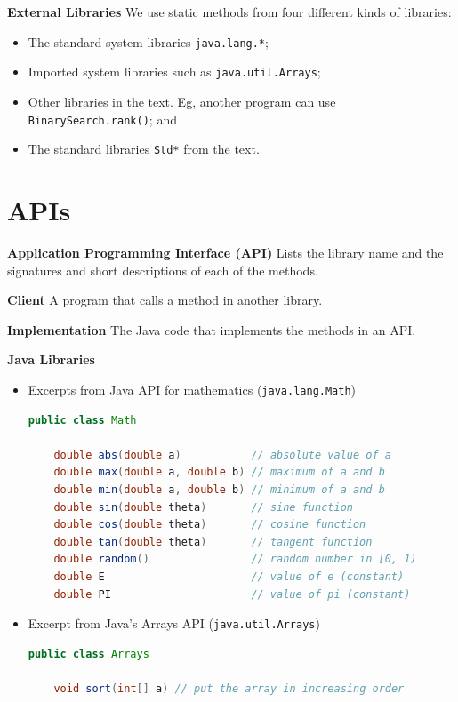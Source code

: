 \documentclass[8pt,a4paper,compress]{beamer}
\begin{document}
\begin{frame}[fragile]
\pause
\textbf{External Libraries} We use static methods from four different kinds of libraries:
\begin{itemize}
\item The standard system libraries \lstinline$java.lang.*$; 
\item Imported system libraries such as \lstinline$java.util.Arrays$; 
\item Other libraries in the text. Eg, another program can use \lstinline$BinarySearch.rank()$; and
\item The standard libraries \lstinline$Std*$ from the text.
\end{itemize}
\end{frame}

\section{APIs}
\begin{frame}[fragile]
\pause
\textbf{Application Programming Interface (API)} Lists the library name and the signatures and short descriptions of each of the methods. 

\pause
\smallskip

\textbf{Client} A program that calls a method in another library.

\pause
\smallskip

\textbf{Implementation} The Java code that implements the methods in an API.

\pause
\smallskip

\textbf{Java Libraries}
\begin{itemize}
\item Excerpts from Java API for mathematics (\lstinline$java.lang.Math$)
\begin{lstlisting}[language=Java]
public class Math

    double abs(double a)           // absolute value of a
    double max(double a, double b) // maximum of a and b
    double min(double a, double b) // minimum of a and b
    double sin(double theta)       // sine function
    double cos(double theta)       // cosine function
    double tan(double theta)       // tangent function
    double random()                // random number in [0, 1)
    double E                       // value of e (constant)
    double PI                      // value of pi (constant)
\end{lstlisting}

\item Excerpt from Java's Arrays API (\lstinline$java.util.Arrays$)
\begin{lstlisting}[language=Java]
public class Arrays

    void sort(int[] a) // put the array in increasing order
\end{lstlisting}
\end{itemize}

\end{frame}
\end{document}
